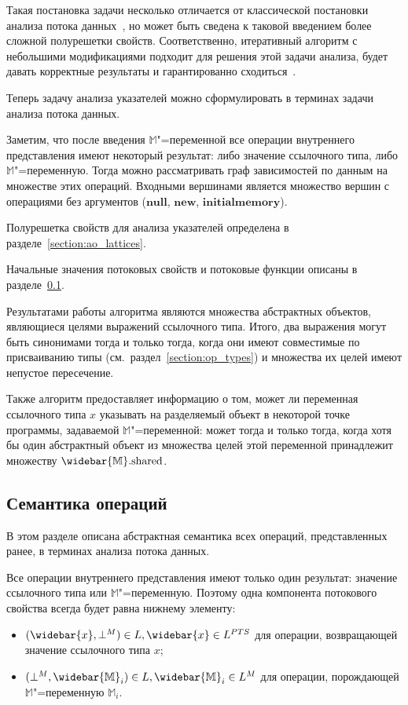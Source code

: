 \documentclass[14pt,titlepage,draft]{extarticle}
\newcommand{\M}{\ensuremath{\mathbb{M}}}
\newcommand{\Ms}{\ensuremath{\mathbb{\widebar{M}}}}
\newcommand{\Mf}[1]{\ensuremath{\mathrm{#1}}}
\newcommand{\op}[1]{\mathbf{#1}}
\newcommand{\pts}[1]{\widebar{#1}}
\begin{document}
    Такая постановка задачи несколько отличается от классической постановки
    анализа потока данных~\cite{muchnick, nielson}, но может быть сведена к
    таковой введением более сложной полурешетки свойств.
    Соответственно, итеративный алгоритм с небольшими модификациями подходит
    для решения этой задачи анализа, будет давать корректные результаты и
    гарантированно сходиться~\cite{kildall}.

    Теперь задачу анализа указателей можно сформулировать в терминах задачи
    анализа потока данных.

    Заметим, что после введения \M"=переменной все операции внутреннего
    представления имеют некоторый результат: либо значение ссылочного типа,
    либо \M"=переменную. Тогда можно рассматривать граф зависимостей по данным
    на множестве этих операций. Входными вершинами является множество вершин с
    операциями без аргументов
    ($\op{null}$, $\op{new}$, $\op{initialmemory}$).

    Полурешетка свойств для анализа указателей определена в
    разделе~\ref{section:ao_lattices}.

    Начальные значения потоковых свойств и потоковые функции описаны
    в разделе~\ref{section:flow_functions}.

    Результатами работы алгоритма являются множества абстрактных объектов,
    являющиеся целями выражений ссылочного типа. Итого, два выражения могут быть
    синонимами тогда и только тогда, когда они имеют совместимые по
    присваиванию типы (см.~раздел~\ref{section:op_types}) и множества их целей
    имеют непустое пересечение.

    Также алгоритм предоставляет информацию о том, может ли переменная
    ссылочного типа $x$ указывать на разделяемый объект в некоторой точке
    программы, задаваемой \M"=переменной: может тогда и только тогда, когда
    хотя бы один абстрактный объект из множества целей этой переменной
    принадлежит множеству $\Ms.\Mf{shared}$.

  \subsection{Семантика операций}
    \label{section:flow_functions}

    В этом разделе описана абстрактная семантика всех операций, представленных ранее, в
    терминах анализа потока данных.

    Все операции внутреннего представления имеют только один результат:
    значение ссылочного типа или \M"=переменную. Поэтому одна компонента
    потокового свойства всегда будет равна нижнему элементу:
    \begin{itemize}
      \item $(\pts{x}, \bot^M) \in L, \pts{x} \in L^{PTS}$ для операции,
            возвращающей значение ссылочного типа $x$;
      \item $(\bot^M, \Ms_i) \in L, \Ms_i \in L^M$ для операции, порождающей
            \M"=переменную $\M_i$.
    \end{itemize}
\end{document}
